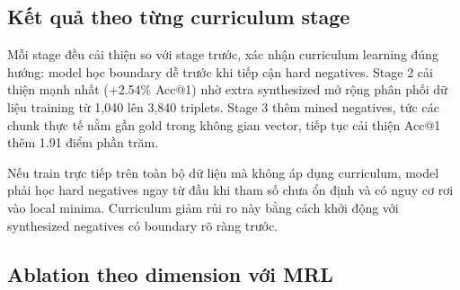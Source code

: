 \documentclass[../DoAn.tex]{subfiles}
\begin{document}
\subsection{Kết quả theo từng curriculum stage}
\label{subsection:5.3.1}

\begin{table}[H]
    \centering
    \caption{Tiến trình cải thiện qua 3 curriculum stages}
    \label{tab:embedding-curriculum-results}
    {\small
    \setlength{\tabcolsep}{3pt}
    }
\end{table}

Mỗi stage đều cải thiện so với stage trước, xác nhận curriculum learning đúng hướng: model học boundary dễ trước khi tiếp cận hard negatives. Stage 2 cải thiện mạnh nhất (+2.54\% Acc@1) nhờ extra synthesized mở rộng phân phối dữ liệu training từ 1,040 lên 3,840 triplets. Stage 3 thêm mined negatives, tức các chunk thực tế nằm gần gold trong không gian vector, tiếp tục cải thiện Acc@1 thêm 1.91 điểm phần trăm.

Nếu train trực tiếp trên toàn bộ dữ liệu mà không áp dụng curriculum, model phải học hard negatives ngay từ đầu khi tham số chưa ổn định và có nguy cơ rơi vào local minima. Curriculum giảm rủi ro này bằng cách khởi động với synthesized negatives có boundary rõ ràng trước.

\subsection{Ablation theo dimension với MRL}
\label{subsection:5.3.2}
\end{document}
